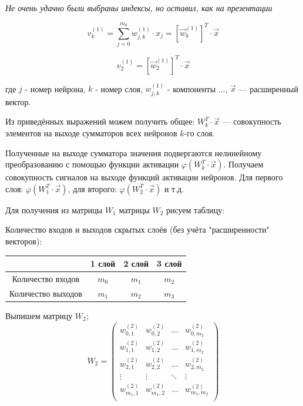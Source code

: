 \documentclass{article}
\numberwithin{equation}{subsection}
\begin{document}
\begin{myquote}
    \textit{Не очень удачно были выбраны индексы, но оставил, как на презентации}
\end{myquote}

\begin{equation}
    {v}_k^{(1)} = \sum_{j=0}^{m_0} w_{j,k}^{(1)} \cdot x_j = [\vec{w}_{k}^{(1)}]^T \cdot \vec{x}
\end{equation}


\begin{equation*}
    {v}_2^{(1)} = [\vec{w}_{2}^{(1)}]^T \cdot \vec{x}
\end{equation*}

где $j$ - номер нейрона, $k$ - номер слоя, $w_{j,k}^{(1)}$ - компоненты ..., $\vec{x}$ ---
 расширенный вектор.

Из приведённых выражений можем получить общее: $W_k^T \cdot \vec{x}$ --- совокупность элементов 
на выходе сумматоров всех нейронов $k$-го слоя.

Полученные на выходе сумматора значения подвергаются нелинейному преобразованию 
с помощью функции активации $\varphi(W_k^T \cdot \vec{x})$. Получаем совокупность 
сигналов на выходе функций активации нейронов. 
Для первого слоя: $\varphi(W_1^T \cdot \vec{x})$, для второго: $\varphi(W_2^T \cdot \vec{x})$ и т.д.

Для получения из матрицы $W_1$ матрицы $W_2$ рисуем таблицу:

\begin{center}
    Количество входов и выходов скрытых слоёв (без учёта "расширенности" векторов):

    \begin{tabular}{c | c |  c | c |}
        & 1 слой & 2 слой & 3 слой \\
        \hline
        Количество входов  & $m_0$ & $m_1$ & $m_2$ \\
        \hline
        Количество выходов & $m_1$ & $m_2$ & $m_3$ \\
        \hline
    \end{tabular}
\end{center}

Выпишем матрицу $W_2$;
\begin{equation}
    W_2 = 
    \begin{pmatrix}
        w_{0,1}^{(2)} & w_{0,2}^{(2)} & \dots & w_{0,{m_2}}^{(2)} \\
        w_{1,1}^{(2)} & w_{1,2}^{(2)} & \dots & w_{1,{m_2}}^{(2)} \\
        w_{2,1}^{(2)} & w_{2,2}^{(2)} & \dots & w_{2,{m_2}}^{(2)} \\
        \vdots        & \vdots        & \ddots & \vdots           \\
        w_{{m_1},1}^{(2)} & w_{{m_1},2}^{(2)} & \dots & w_{{m_1},{m_2}}^{(2)} \\
    \end{pmatrix}
\end{equation}
\end{document}
